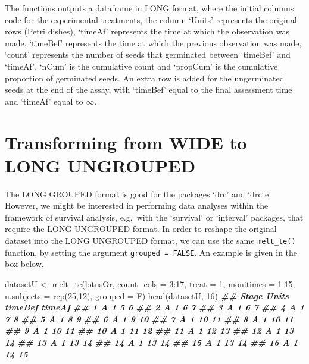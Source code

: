 \documentclass[
]{book}
\newenvironment{Shaded}{\begin{snugshade}}{\end{snugshade}}
\newcommand{\AttributeTok}[1]{\textcolor[rgb]{0.77,0.63,0.00}{#1}}
\newcommand{\DecValTok}[1]{\textcolor[rgb]{0.00,0.00,0.81}{#1}}
\newcommand{\DocumentationTok}[1]{\textcolor[rgb]{0.56,0.35,0.01}{\textbf{\textit{#1}}}}
\newcommand{\FunctionTok}[1]{\textcolor[rgb]{0.00,0.00,0.00}{#1}}
\newcommand{\NormalTok}[1]{#1}
\newcommand{\OtherTok}[1]{\textcolor[rgb]{0.56,0.35,0.01}{#1}}
\newcommand{\SpecialCharTok}[1]{\textcolor[rgb]{0.00,0.00,0.00}{#1}}
\begin{document}
The functions outputs a dataframe in LONG format, where the initial columns code for the experimental treatments, the column `Units' represents the original rows (Petri dishes), `timeAf' represents the time at which the observation was made, `timeBef' represents the time at which the previous observation was made, `count' represents the number of seeds that germinated between `timeBef' and `timeAf', `nCum' is the cumulative count and `propCum' is the cumulative proportion of germinated seeds. An extra row is added for the ungerminated seeds at the end of the assay, with `timeBef' equal to the final assessment time and `timeAf' equal to \(\infty\).

\hypertarget{transforming-from-wide-to-long-ungrouped}{%
\section{Transforming from WIDE to LONG UNGROUPED}\label{transforming-from-wide-to-long-ungrouped}}

The LONG GROUPED format is good for the packages `drc' and `drcte'. However, we might be interested in performing data analyses within the framework of survival analysis, e.g.~with the `survival' or `interval' packages, that require the LONG UNGROUPED format. In order to reshape the original dataset into the LONG UNGROUPED format, we can use the same \texttt{melt\_te()} function, by setting the argument \texttt{grouped\ =\ FALSE}. An example is given in the box below.

\begin{Shaded}
\begin{Highlighting}[]
\NormalTok{datasetU }\OtherTok{\textless{}{-}} \FunctionTok{melt\_te}\NormalTok{(lotusOr, }\AttributeTok{count\_cols =} \DecValTok{3}\SpecialCharTok{:}\DecValTok{17}\NormalTok{, }\AttributeTok{treat =} \DecValTok{1}\NormalTok{, }
                   \AttributeTok{monitimes =} \DecValTok{1}\SpecialCharTok{:}\DecValTok{15}\NormalTok{, }\AttributeTok{n.subjects =} \FunctionTok{rep}\NormalTok{(}\DecValTok{25}\NormalTok{,}\DecValTok{12}\NormalTok{), }\AttributeTok{grouped =}\NormalTok{ F)}
\FunctionTok{head}\NormalTok{(datasetU, }\DecValTok{16}\NormalTok{)}
\DocumentationTok{\#\#    Stage Units timeBef timeAf}
\DocumentationTok{\#\# 1      A     1       5      6}
\DocumentationTok{\#\# 2      A     1       6      7}
\DocumentationTok{\#\# 3      A     1       6      7}
\DocumentationTok{\#\# 4      A     1       7      8}
\DocumentationTok{\#\# 5      A     1       8      9}
\DocumentationTok{\#\# 6      A     1       9     10}
\DocumentationTok{\#\# 7      A     1      10     11}
\DocumentationTok{\#\# 8      A     1      10     11}
\DocumentationTok{\#\# 9      A     1      10     11}
\DocumentationTok{\#\# 10     A     1      11     12}
\DocumentationTok{\#\# 11     A     1      12     13}
\DocumentationTok{\#\# 12     A     1      13     14}
\DocumentationTok{\#\# 13     A     1      13     14}
\DocumentationTok{\#\# 14     A     1      13     14}
\DocumentationTok{\#\# 15     A     1      13     14}
\DocumentationTok{\#\# 16     A     1      14     15}
\end{Highlighting}
\end{Shaded}
\end{document}

